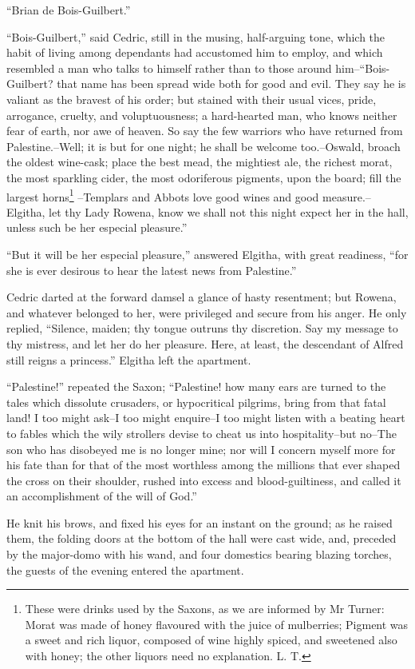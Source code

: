 ``Brian de Bois-Guilbert.''

``Bois-Guilbert,'' said Cedric, still in the musing, half-arguing tone,
which the habit of living among dependants had accustomed him to employ,
and which resembled a man who talks to himself rather than to those
around him--``Bois-Guilbert? that name has been spread wide both for
good and evil. They say he is valiant as the bravest of his order; but
stained with their usual vices, pride, arrogance, cruelty, and
voluptuousness; a hard-hearted man, who knows neither fear of earth, nor
awe of heaven. So say the few warriors who have returned from
Palestine.--Well; it is but for one night; he shall be welcome
too.--Oswald, broach the oldest wine-cask; place the best mead, the
mightiest ale, the richest morat, the most sparkling cider, the most
odoriferous pigments, upon the board; fill the largest
horns\footnote{These were drinks used by the Saxons,
as we are informed
by Mr Turner: Morat was made of honey flavoured with the juice of
mulberries; Pigment was a sweet and rich liquor, composed of wine highly
spiced, and sweetened also with honey; the other liquors need no
explanation. L. T.}
--Templars and Abbots love good wines and good measure.--Elgitha, let
thy Lady Rowena, know we shall not this night expect her in the hall,
unless such be her especial pleasure.''

``But it will be her especial pleasure,'' answered Elgitha, with great
readiness, ``for she is ever desirous to hear the latest news from
Palestine.''

Cedric darted at the forward damsel a glance of hasty resentment; but
Rowena, and whatever belonged to her, were privileged and secure from
his anger. He only replied, ``Silence, maiden; thy tongue outruns thy
discretion. Say my message to thy mistress, and let her do her pleasure.
Here, at least, the descendant of Alfred still reigns a princess.''
Elgitha left the apartment.

``Palestine!'' repeated the Saxon; ``Palestine! how many ears are turned
to the tales which dissolute crusaders, or hypocritical pilgrims, bring
from that fatal land! I too might ask--I too might enquire--I too might
listen with a beating heart to fables which the wily strollers devise to
cheat us into hospitality--but no--The son who has disobeyed me is no
longer mine; nor will I concern myself more for his fate than for that
of the most worthless among the millions that ever shaped the cross on
their shoulder, rushed into excess and blood-guiltiness, and called it
an accomplishment of the will of God.''

He knit his brows, and fixed his eyes for an instant on the ground; as
he raised them, the folding doors at the bottom of the hall were cast
wide, and, preceded by the major-domo with his wand, and four domestics
bearing blazing torches, the guests of the evening entered the
apartment.
